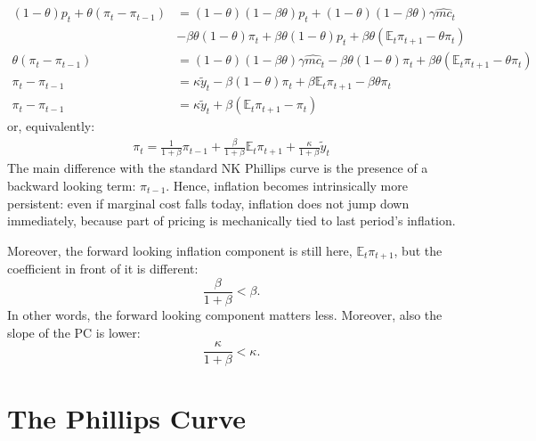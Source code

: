 \documentclass[dvipsnames,11pt]{article}
\begin{document}
\begin{enumerate}[resume]
\begin{solution}
\begin{align*}
    (1-\theta) p_t +\theta(\pi_t-\pi_{t-1})&= (1-\theta)(1-\beta\theta)p_t +(1-\theta)(1-\beta\theta)\gamma \widehat{mc}_t\\&-\beta \theta(1-\theta) \pi_t+\beta \theta (1-\theta)p_t+\beta \theta (\mathbb{E}_t \pi_{t+1}-\theta \pi_t) \\
    \theta (\pi_t-\pi_{t-1}) &= (1-\theta)(1-\beta\theta)\gamma  \widehat{mc}_t -\beta \theta(1-\theta) \pi_t +\beta \theta (\mathbb{E}_t\pi_{t+1}-\theta \pi_t) \\
    \pi_t-\pi_{t-1} &= \kappa \tilde{y}_t -\beta(1-\theta)\pi_t+\beta \mathbb{E}_t \pi_{t+1}-\beta \theta \pi_t \\
    \pi_t -\pi_{t-1}&= \kappa \tilde{y}_t +\beta (\mathbb{E}_t \pi_{t+1}-\pi_t)
\end{align*}
or, equivalently:
\begin{align*}
    \pi_t= \frac{1}{1+\beta}\pi_{t-1}+\frac{\beta}{1+\beta} \mathbb{E}_t \pi_{t+1}+\frac{\kappa}{1+\beta}\tilde{y}_t
\end{align*}
The main difference with the standard NK Phillips curve is the presence of a backward looking term: $\pi_{t-1}$. Hence, inflation becomes intrinsically more persistent: even if marginal cost falls today, inflation does not jump down immediately, because part of pricing is mechanically tied to last period’s inflation.

Moreover, the forward looking inflation component is still here, $\mathbb{E}_t\pi_{t+1}$, but the coefficient in front of it is different:
\[
\frac{\beta}{1+\beta}< \beta. 
\]
In other words, the forward looking component matters less. Moreover, also the slope of the PC is lower:
\[
\frac{\kappa}{1+\beta}<\kappa.
\]
            
            
        \end{solution}

    \end{enumerate}





% 



\newpage
\section{The Phillips Curve}
\end{document}
